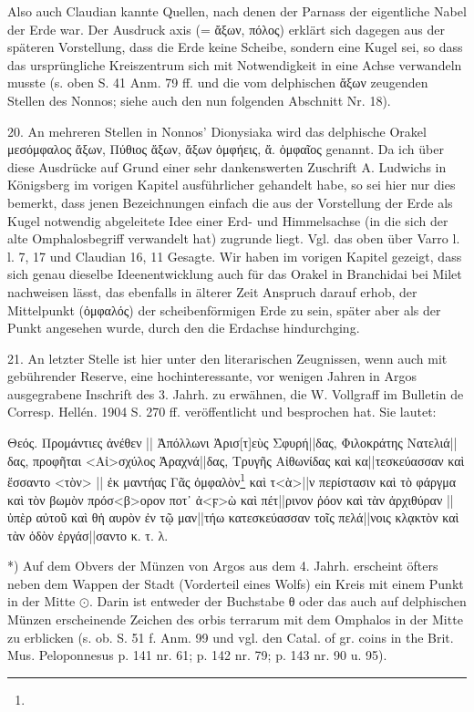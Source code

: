\documentclass[a4paper, 11pt, oneside]{article}
\begin{document}
Also auch Claudian kannte Quellen, nach denen der Parnass der eigentliche Nabel der Erde war. Der Ausdruck axis (= ἄξων, πόλος) erklärt sich dagegen aus der späteren Vorstellung, dass die Erde keine Scheibe, sondern eine Kugel sei, so dass das ursprüngliche Kreiszentrum sich mit Notwendigkeit in eine Achse verwandeln musste (s. oben S. 41 Anm. 79 ff. und die vom delphischen ἄξων zeugenden Stellen des Nonnos; siehe auch den nun folgenden Abschnitt Nr. 18).

20. An mehreren Stellen in Nonnos' Dionysiaka wird das delphische Orakel μεσόμφαλος ἄξων, Πύθιος ἄξων, ἄξων ὀμφήεις, ἄ. ὀμφαῖος genannt. Da ich über diese Ausdrücke auf Grund einer sehr dankenswerten Zuschrift A. Ludwichs in Königsberg im vorigen Kapitel ausführlicher gehandelt habe, so sei hier nur dies bemerkt, dass jenen Bezeichnungen einfach die aus der Vorstellung der Erde als Kugel notwendig abgeleitete Idee einer Erd- und Himmelsachse (in die sich der alte Omphalosbegriff verwandelt hat) zugrunde liegt. Vgl. das oben über Varro l. l. 7, 17 und Claudian 16, 11 Gesagte. Wir haben im vorigen Kapitel gezeigt, dass sich genau dieselbe Ideenentwicklung auch für das Orakel in Branchidai bei Milet nachweisen lässt, das ebenfalls in älterer Zeit Anspruch darauf erhob, der Mittelpunkt (ὀμφαλός) der scheibenförmigen Erde zu sein, später aber als der Punkt angesehen wurde, durch den die Erdachse hindurchging.

21. An letzter Stelle ist hier unter den literarischen Zeugnissen, wenn auch mit gebührender Reserve, eine hochinteressante, vor wenigen Jahren in Argos ausgegrabene Inschrift des 3. Jahrh. zu erwähnen, die W. Vollgraff im Bulletin de Corresp. Hellén. 1904 S. 270 ff. veröffentlicht und besprochen hat. Sie lautet:

Θεός. Προμάντιες ἀνέθεν || Ἀπόλλωνι Ἀρισ[τ]εὺς Σφυρή||δας, Φιλοκράτης Νατελιά||δας, προφῆται <Αἰ>σχύλος Ἀραχνά||δας, Τρυγῆς Αἰθωνίδας καὶ κα||τεσκεύασσαν καὶ ἕσσαντο <τὸν> || ἐκ μαντήας Γᾶς ὀμφαλὸν\footnote{} καὶ τ<ὰ>||ν περίστασιν καὶ τὸ φάργμα καὶ τὸν βωμὸν πρόσ<β>ορον ποτ᾽ ἀ<ϝ>ὼ καὶ πέτ||ρινον ῥόον καὶ τὰν ἀρχιθύραν || ὑπὲρ αὐτοῦ καὶ θἡ αυρὸν ἐν τῷ μαν||τήω κατεσκεύασσαν τοῖς πελά||νοις κλᾳκτὸν καὶ τὰν ὁδὸν ἐργάσ||σαντο κ. τ. λ.

*) Auf dem Obvers der Münzen von Argos aus dem 4. Jahrh. erscheint öfters neben dem Wappen der Stadt (Vorderteil eines Wolfs) ein Kreis mit einem Punkt in der Mitte $\odot$. Darin ist entweder der Buchstabe θ oder das auch auf delphischen Münzen erscheinende Zeichen des orbis terrarum mit dem Omphalos in der Mitte zu erblicken (s. ob. S. 51 f. Anm. 99 und vgl. den Catal. of gr. coins in the Brit. Mus. Peloponnesus p. 141 nr. 61; p. 142 nr. 79; p. 143 nr. 90 u. 95).
\end{document}
